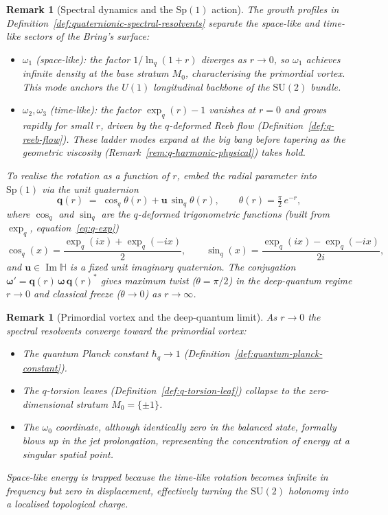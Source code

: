 \documentclass[12pt,a4paper]{report}
\newtheorem{remark}[theorem]{Remark}
\begin{document}
\begin{remark}[Spectral dynamics and the $\mathrm{Sp}(1)$ action]
\label{rem:spectral-dynamics}
The growth profiles in
Definition~\ref{def:quaternionic-spectral-resolvents} separate the space-like
and time-like sectors of the Bring's surface:
\begin{itemize}
\item \emph{$\omega_1$ (space-like):}\; the factor $1/\ln_q(1+r)$ diverges
  as $r\to 0$, so $\omega_1$ achieves infinite density at the base stratum
  $M_0$, characterising the primordial vortex.  This mode anchors the
  $U(1)$ longitudinal backbone of the $\mathrm{SU}(2)$ bundle.
\item \emph{$\omega_2,\omega_3$ (time-like):}\; the factor
  $\exp_q(r)-1$ vanishes at $r=0$ and grows rapidly for small $r$,
  driven by the $q$-deformed Reeb flow
  (Definition~\ref{def:q-reeb-flow}).  These ladder modes expand at the big
  bang before tapering as the geometric viscosity
  (Remark~\ref{rem:q-harmonic-physical}) takes hold.
\end{itemize}
To realise the rotation as a function of $r$, embed the radial parameter
into $\mathrm{Sp}(1)$ via the unit quaternion
\begin{equation}\label{eq:sp1-quaternion}
  \mathbf{q}(r)
  \;=\;
  \cos_q\!\theta(r)+\mathbf{u}\,\sin_q\!\theta(r),
  \qquad
  \theta(r)=\tfrac{\pi}{2}\,e^{-r},
\end{equation}
where $\cos_q$ and $\sin_q$ are the $q$-deformed trigonometric functions
(built from $\exp_q$, equation~\eqref{eq:q-exp})
\[
  \cos_q(x)=\frac{\exp_q(ix)+\exp_q(-ix)}{2},
  \qquad
  \sin_q(x)=\frac{\exp_q(ix)-\exp_q(-ix)}{2i},
\]
and $\mathbf{u}\in\operatorname{Im}\mathbb{H}$ is a fixed unit imaginary
quaternion.  The conjugation
$\boldsymbol{\omega}'=\mathbf{q}(r)\,\boldsymbol{\omega}\,\mathbf{q}(r)^{*}$
gives maximum twist ($\theta=\pi/2$) in the deep-quantum regime $r\to 0$
and classical freeze ($\theta\to 0$) as $r\to\infty$.
\end{remark}

\begin{remark}[Primordial vortex and the deep-quantum limit]
\label{rem:primordial-vortex}
As $r\to 0$ the spectral resolvents converge toward the
\emph{primordial vortex}:
\begin{itemize}
\item The quantum Planck constant
  $\hbar_q\to 1$ (Definition~\ref{def:quantum-planck-constant}).
\item The $q$-torsion leaves
  (Definition~\ref{def:q-torsion-leaf}) collapse to the zero-dimensional
  stratum $M_0=\{\pm 1\}$.
\item The $\omega_0$ coordinate, although identically zero in the
  balanced state, formally blows up in the jet prolongation, representing
  the concentration of energy at a singular spatial point.
\end{itemize}
Space-like energy is trapped because the time-like rotation becomes infinite
in frequency but zero in displacement, effectively turning the
$\mathrm{SU}(2)$ holonomy into a localised topological charge.
\end{remark}
\end{document}
